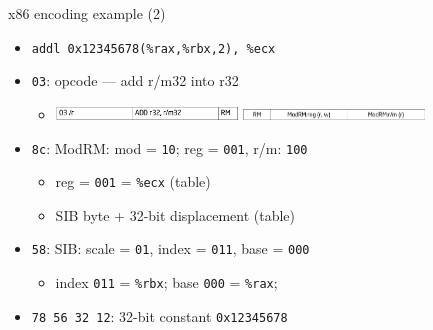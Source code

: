 \begin{frame}[fragile,label=x86ex2]{x86 encoding example (2)}
    \begin{itemize}
    \item \lstinline|addl 0x12345678(%rax,%rbx,2), %ecx|
    \item {\tt 03}: opcode --- add r/m32 into r32 
        \begin{itemize}
        \item
            \includegraphics[width=0.4\textwidth]{../x8664-encoding/intel-manual-addl-ex1.png}
            \includegraphics[width=0.4\textwidth]{../x8664-encoding/intel-manual-addl-ex2.png}
        \end{itemize}
    \item {\tt 8c}: ModRM: mod = {\tt 10}; reg = {\tt 001}, r/m: {\tt 100}
        \begin{itemize}
        \item reg = {\tt 001} = {\tt \%ecx} (table)
        \item SIB byte + 32-bit displacement (table)
        \end{itemize}
    \item {\tt 58}: SIB: scale = {\tt 01}, index = {\tt 011}, base = {\tt 000}
        \begin{itemize}
        \item index {\tt 011} = {\tt \%rbx}; base {\tt 000} = {\tt \%rax};
        \end{itemize}
    \item {\tt 78 56 32 12}: 32-bit constant {\tt 0x12345678}
    \end{itemize}
\end{frame}

